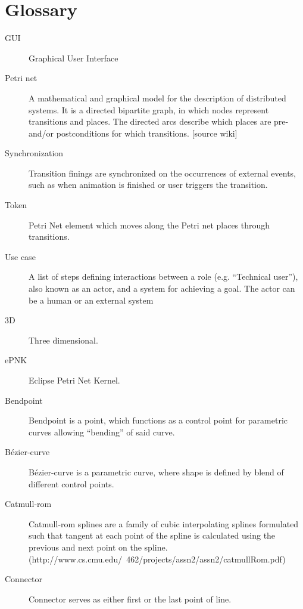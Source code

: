 \section{Glossary}
\begin{description}

\item [GUI] Graphical User Interface

\item [Petri net] A mathematical and graphical model for the description of distributed systems. It is a directed bipartite graph, in which nodes represent transitions and places. The directed arcs describe which places are pre- and/or postconditions for which transitions. [source wiki]

\item [Synchronization] Transition finings are synchronized on the occurrences of external events, such as when animation is finished or user triggers the transition.

\item [Token] Petri Net element which moves along the Petri net places through transitions.

\item [Use case] A list of steps defining interactions between a role (e.g. “Technical user”), also known as an actor, and a system for achieving a goal. The actor can be a human or an external system

\item [3D] Three dimensional.

\item [ePNK] Eclipse Petri Net Kernel.

\item [Bendpoint] Bendpoint is a point, which functions as a control point for parametric curves allowing “bending” of said curve.

\item [Bézier-curve] Bézier-curve is a parametric curve, where shape is defined by blend of different control points.

\item [Catmull-rom] Catmull-rom splines are a family of cubic interpolating splines formulated such that tangent at each point of the spline is calculated using the previous and next point on the spline. (http://www.cs.cmu.edu/~462/projects/assn2/assn2/catmullRom.pdf)

\item [Connector]  Connector serves as either first or the last point of line.


\end{description}

